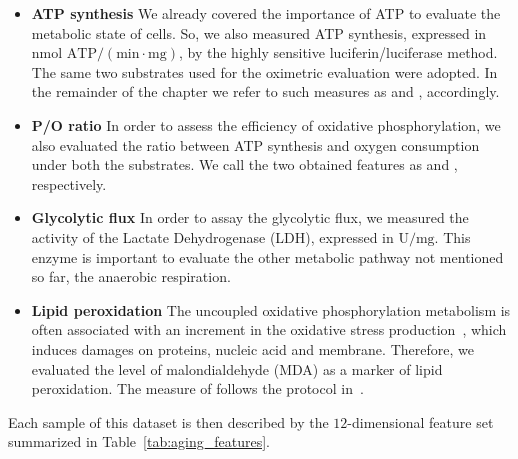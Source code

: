 \begin{itemize}
	\item[] \textbf{ATP synthesis} We already covered the importance of ATP to evaluate the metabolic state of cells. So, we also measured ATP synthesis, expressed in $\text{nmol~ATP}/(\text{min}\cdot\text{mg})$,  by the highly sensitive luciferin/luciferase method. The same two substrates used for the oximetric evaluation were adopted. In the remainder of the chapter we refer to such measures as \atppyrmal and \atpsucc, accordingly.
	
	\item[] \textbf{P/O ratio} In order to assess the efficiency of oxidative phosphorylation, we also evaluated the ratio between ATP synthesis and oxygen consumption under both the substrates. We call the two obtained features as \popyrmal and \posucc, respectively.
	
	\item[] \textbf{Glycolytic flux} In order to assay the glycolytic flux, we measured the activity of the Lactate Dehydrogenase (\ac{LDH}), expressed in $\text{U}/\text{mg}$. This enzyme is important to evaluate the other metabolic pathway not mentioned so far, \ie the anaerobic respiration.
	
	\item[] \textbf{Lipid peroxidation} The uncoupled oxidative phosphorylation metabolism is often associated with an increment in the oxidative stress production~\cite{dai2014mitochondrial}, which induces damages on proteins, nucleic acid and membrane. Therefore, we evaluated the level of malondialdehyde (\ac{MDA}) as a marker of lipid peroxidation. The measure of \mda follows the protocol in~\cite{ravera2015oxidative}.
\end{itemize}

Each sample of this dataset is then described by the $12$-dimensional feature set summarized in Table~\ref{tab:aging_features}.

